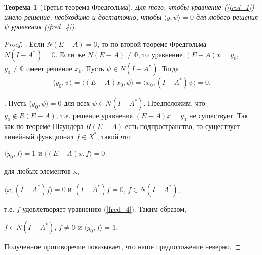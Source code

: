 \documentclass[12pt,a4paper,titlepage,oneside]{book}
\theoremstyle{definition}
\theoremstyle{plain}
\newtheorem*{theorem}{Теорема}
\theoremstyle{break}
\theoremstyle{remark}
\theoremstyle{remark}
\theoremstyle{remark}
\theoremstyle{remark}
\theoremstyle{plain}
\theoremstyle{plain}
\begin{document}
\begin{theorem}[Третья теорема Фредгольма]
Для того, чтобы уравнение (\ref{fred_1}) имело решение, необходимо и достаточно, чтобы $ \langle y,\psi \rangle =0$ для любого решения $\psi$ уравнения (\ref{fred_4}).
\end{theorem}
\begin{proof}
. Если $N(E-A)={\mathbb{0}}$, то по второй теореме Фредгольма $N(I-A^*)={\mathbb{0}}$. Если же $N(E-A)\neq {\mathbb{0}}$, то уравнение $(E-A)x=y_0$, $y_0 \neq \mathbb{0}$ имеет решение $x_0$. Пусть $\psi \in N(I-A^*)$. Тогда
$$\langle y_0,\psi \rangle = \langle (E-A)x_0,\psi \rangle = \langle x_0,(I-A^*)\psi \rangle =0.$$

. Пусть $ \langle y_0,\psi \rangle =0$ для всех $\psi \in N(I-A^*)$. Предположим, что \\$y_0 \not \in R(E-A)$, т.е. решение уравнения $(E-A)x=y_0$ не существует. Так как по теореме Шаундера $R(E-A)$ есть подпространство, то существует линейный функционал $f\in X^*$, такой что 
\begin{center}
$ \langle y_0,f \rangle =1$ и $ \langle (E-A)x,f \rangle =0$
\end{center}
для любых элементов x,
\begin{center}
$ \langle x,(I-A^*)f \rangle =0$ и $(I-A^*)f=\mathbb{0}$, $f \in N(I-A^*)$,
\end{center}
т.е. $f$ удовлетворяет уравнению (\ref{fred_4}). Таким образом,
\begin{center}
 $f \in N(I-A^*)$, $f\neq \mathbb{0}$ и $ \langle y_0,f \rangle =1$.
\end{center}
Полученное противоречие показывает, что наше предположение неверно.
\end{proof}
\end{document}
